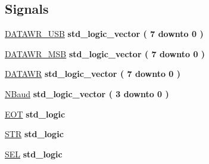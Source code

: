 \subsection*{Signals}
 \begin{DoxyCompactItemize}
\item 
\hyperlink{class_r_s232_write__16_1_1moore_a6c29e897c80f5080b8988e2a012806c7}{D\+A\+T\+A\+W\+R\+\_\+\+U\+S\+B} {\bfseries \textcolor{comment}{std\+\_\+logic\+\_\+vector}\textcolor{vhdlchar}{ }\textcolor{vhdlchar}{(}\textcolor{vhdlchar}{ }\textcolor{vhdlchar}{ } \textcolor{vhdldigit}{7} \textcolor{vhdlchar}{ }\textcolor{keywordflow}{downto}\textcolor{vhdlchar}{ }\textcolor{vhdlchar}{ } \textcolor{vhdldigit}{0} \textcolor{vhdlchar}{ }\textcolor{vhdlchar}{)}\textcolor{vhdlchar}{ }} 
\item 
\hyperlink{class_r_s232_write__16_1_1moore_ad5028bba71b98c2321c8deaa4bd765a7}{D\+A\+T\+A\+W\+R\+\_\+\+M\+S\+B} {\bfseries \textcolor{comment}{std\+\_\+logic\+\_\+vector}\textcolor{vhdlchar}{ }\textcolor{vhdlchar}{(}\textcolor{vhdlchar}{ }\textcolor{vhdlchar}{ } \textcolor{vhdldigit}{7} \textcolor{vhdlchar}{ }\textcolor{keywordflow}{downto}\textcolor{vhdlchar}{ }\textcolor{vhdlchar}{ } \textcolor{vhdldigit}{0} \textcolor{vhdlchar}{ }\textcolor{vhdlchar}{)}\textcolor{vhdlchar}{ }} 
\item 
\hyperlink{class_r_s232_write__16_1_1moore_a3b08085e58e4e71e997771e87e333486}{D\+A\+T\+A\+W\+R} {\bfseries \textcolor{comment}{std\+\_\+logic\+\_\+vector}\textcolor{vhdlchar}{ }\textcolor{vhdlchar}{(}\textcolor{vhdlchar}{ }\textcolor{vhdlchar}{ } \textcolor{vhdldigit}{7} \textcolor{vhdlchar}{ }\textcolor{keywordflow}{downto}\textcolor{vhdlchar}{ }\textcolor{vhdlchar}{ } \textcolor{vhdldigit}{0} \textcolor{vhdlchar}{ }\textcolor{vhdlchar}{)}\textcolor{vhdlchar}{ }} 
\item 
\hyperlink{class_r_s232_write__16_1_1moore_a772e393b5bc102d160a760efebdcbc14}{N\+Baud} {\bfseries \textcolor{comment}{std\+\_\+logic\+\_\+vector}\textcolor{vhdlchar}{ }\textcolor{vhdlchar}{(}\textcolor{vhdlchar}{ }\textcolor{vhdlchar}{ } \textcolor{vhdldigit}{3} \textcolor{vhdlchar}{ }\textcolor{keywordflow}{downto}\textcolor{vhdlchar}{ }\textcolor{vhdlchar}{ } \textcolor{vhdldigit}{0} \textcolor{vhdlchar}{ }\textcolor{vhdlchar}{)}\textcolor{vhdlchar}{ }} 
\item 
\hyperlink{class_r_s232_write__16_1_1moore_ab46ad2614ce45c13363bb04ec0ce63b0}{E\+O\+T} {\bfseries \textcolor{comment}{std\+\_\+logic}\textcolor{vhdlchar}{ }} 
\item 
\hyperlink{class_r_s232_write__16_1_1moore_aa83559e5e362025fecda2fade2ca1317}{S\+T\+R} {\bfseries \textcolor{comment}{std\+\_\+logic}\textcolor{vhdlchar}{ }} 
\item 
\hyperlink{class_r_s232_write__16_1_1moore_abdf2e80ceb5870d633a63af2f876805b}{S\+E\+L} {\bfseries \textcolor{comment}{std\+\_\+logic}\textcolor{vhdlchar}{ }} 
\end{DoxyCompactItemize}
